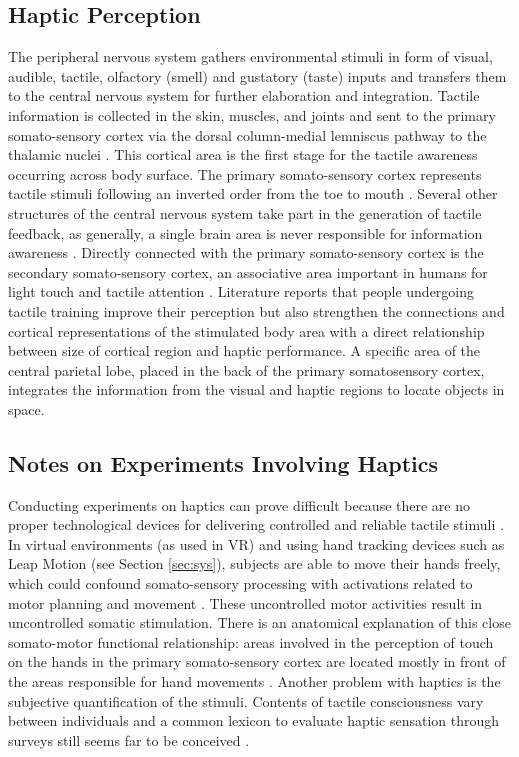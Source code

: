 \documentclass{article}
\begin{document}
\subsection{Haptic Perception}
The peripheral nervous system gathers environmental stimuli in form of visual, audible, tactile, olfactory (smell) and gustatory (taste) inputs and transfers them to the central nervous system for further elaboration and integration. Tactile information is collected in the skin, muscles, and joints and sent to the primary somato-sensory cortex via the dorsal column-medial lemniscus pathway to the thalamic nuclei \cite{Blatow2007}. This cortical area is the first stage for the tactile awareness occurring across body surface. The primary somato-sensory cortex represents tactile stimuli following an inverted order from the toe to mouth \cite{Narici1999}. Several other structures of the central nervous system take part in the generation of tactile feedback, as generally, a single brain area is never responsible for information awareness \cite{Manzoni1986}. Directly connected with the primary somato-sensory cortex is the secondary somato-sensory cortex, an associative area important in humans for light touch and tactile attention \cite{Eickhoff2005}. Literature reports that people undergoing tactile training improve their perception but also strengthen the connections and cortical representations of the stimulated body area \cite{Saito2007} with a direct relationship between size of cortical region and haptic performance. A specific area of the central parietal lobe, placed in the back of the primary somatosensory cortex, integrates the information from the visual and haptic regions to locate objects in space. 

\subsection{Notes on Experiments Involving Haptics}
Conducting experiments on haptics can prove difficult because there are no proper technological devices for delivering controlled and reliable tactile stimuli \cite{Gallace2012}. In virtual environments (as used in VR) and using hand tracking devices such as Leap Motion \cite{leapwebsite} (see Section \ref{sec:sys}), subjects are able to move their hands freely, which could confound somato-sensory processing with activations related to motor planning and movement \cite{Bodegard2001}. These uncontrolled motor activities result in uncontrolled somatic stimulation. There is an anatomical explanation of this close somato-motor functional relationship: areas involved in the perception of touch on the hands in the primary somato-sensory cortex are located mostly in front of the areas responsible for hand movements \cite{Penfield1950}.
Another problem with haptics is the subjective quantification of the stimuli. Contents of tactile consciousness vary between individuals and a common lexicon to evaluate haptic sensation through surveys still seems far to be conceived \cite{Gallace2010}.
\end{document}

